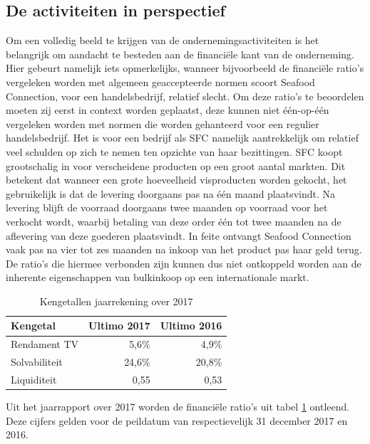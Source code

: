 \documentclass[10pt,a4paper,twoside]{report}
\begin{document}
\subsection{De activiteiten in perspectief} \label{beschr:activiteiten}
Om een volledig beeld te krijgen van de ondernemingsactiviteiten is het belangrijk om aandacht te besteden aan de financiële kant van de onderneming. Hier gebeurt namelijk iets opmerkelijks, wanneer bijvoorbeeld de financiële ratio's vergeleken worden met algemeen geaccepteerde normen scoort Seafood Connection, voor een handelsbedrijf, relatief slecht. Om deze ratio’s te beoordelen moeten zij eerst in context worden geplaatst, deze kunnen niet één-op-één vergeleken worden met normen die worden gehanteerd voor een regulier handelsbedrijf. Het is voor een bedrijf als SFC namelijk aantrekkelijk om relatief veel schulden op zich te nemen ten opzichte van haar bezittingen. SFC koopt grootschalig in voor verscheidene producten op een groot aantal markten. Dit betekent dat wanneer een grote hoeveelheid visproducten worden gekocht, het gebruikelijk is dat de levering doorgaans pas na één maand plaatsvindt. Na levering blijft de voorraad doorgaans twee maanden op voorraad voor het verkocht wordt, waarbij betaling van deze order één tot twee maanden na de aflevering van deze goederen plaatsvindt. In feite ontvangt Seafood Connection vaak pas na vier tot zes maanden na inkoop van het product pas haar geld terug. De ratio’s die hiermee verbonden zijn kunnen dus niet ontkoppeld worden aan de inherente eigenschappen van bulkinkoop op een internationale markt. \citep{jaarrapport2017}

\begin{table}[h]
    \centering
    \caption{Kengetallen jaarrekening over 2017 \citep{jaarrapport2017}}
    \begin{tabular}{l r r}
        \toprule
        \textbf{Kengetal} & \textbf{Ultimo 2017} & \textbf{Ultimo 2016} \\
        \midrule
        Rendament TV & 5,6\% & 4,9\% \\
        Solvabiliteit & 24,6\% & 20,8\% \\
        Liquiditeit & 0,55 & 0,53 \\
        \bottomrule
    \end{tabular}
    \label{tab:kengetallen}
\end{table}

Uit het jaarrapport over 2017 worden de financiële ratio’s uit tabel \ref{tab:kengetallen} ontleend. Deze cijfers gelden voor de peildatum van respectievelijk 31 december 2017 en 2016.
\end{document}
